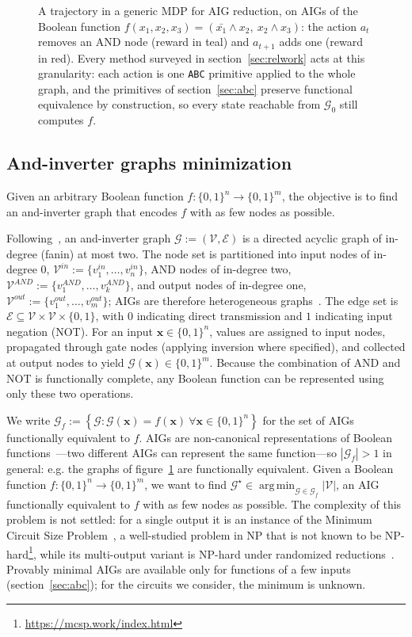 \documentclass{article}
\begin{document}
\begin{figure}[h]
  \caption{A trajectory in a generic MDP for AIG reduction, on AIGs of the Boolean function $f(x_1, x_2, x_3) = (\bar{x_1}\land x_2,\ x_2 \land x_3)$: the action $a_t$ removes an AND node (reward in teal) and $a_{t+1}$ adds one (reward in red). Every method surveyed in section~\ref{sec:relwork} acts at this granularity: each action is one \texttt{ABC} primitive applied to the whole graph, and the primitives of section~\ref{sec:abc} preserve functional equivalence by construction, so every state reachable from $\mathcal{G}_0$ still computes $f$.}
  \label{fig:mdp}
\end{figure}

\subsection{And-inverter graphs minimization}\label{sec:aig-min}
Given an arbitrary Boolean function $f:\{0, 1\}^n \rightarrow \{0, 1\}^m$, the objective is to find an and-inverter graph that encodes $f$ with as few nodes as possible.

Following~\citet{graphbench}, an and-inverter graph $\mathcal{G}:=(\mathcal{V}, \mathcal{E})$ is a directed acyclic graph of in-degree (fanin) at most two.
The node set is partitioned into input nodes of in-degree $0$, $\mathcal{V}^{in} := \{v^{in}_1,\dots,v^{in}_n\}$, AND nodes of in-degree two, $\mathcal{V}^{AND}:=\{v^{AND}_1,\dots,v^{AND}_k\}$, and output nodes of in-degree one, $\mathcal{V}^{out}:=\{v^{out}_1,\dots,v^{out}_m\}$; AIGs are therefore heterogeneous graphs~\cite{hetero}.
The edge set is $\mathcal{E}\subseteq \mathcal{V}\times \mathcal{V} \times \{0, 1\}$, with $0$ indicating direct transmission and $1$ indicating input negation (NOT).
For an input $\boldsymbol{x}\in \{0, 1\}^n$, values are assigned to input nodes, propagated through gate nodes (applying inversion where specified), and collected at output nodes to yield $\mathcal{G}(\boldsymbol{x})\in \{0, 1\}^m$.
Because the combination of AND and NOT is functionally complete, any Boolean function can be represented using only these two operations.

We write $\mathcal{G}_f:=\left\{\mathcal{G}: \mathcal{G} (\boldsymbol{x}) = f(\boldsymbol{x})\ \forall \boldsymbol{x}\in \{0, 1\}^n\right\}$ for the set of AIGs functionally equivalent to $f$.
AIGs are non-canonical representations of Boolean functions~\cite{fraig}---two different AIGs can represent the same function---so $|\mathcal{G}_f| > 1$ in general: e.g. the graphs of figure~\ref{fig:mdp} are functionally equivalent.
Given a Boolean function $f:\{0, 1\}^n \rightarrow \{0, 1\}^m$, we want to find $\mathcal{G}^\star \in \operatorname{arg\,min}_{\mathcal{G}\in \mathcal{G}_f} |\mathcal{V}|$, an AIG functionally equivalent to $f$ with as few nodes as possible.
The complexity of this problem is not settled: for a single output it is an instance of the Minimum Circuit Size Problem~\cite{nphard}, a well-studied problem in NP that is not known to be NP-hard\footnote{\url{https://mcsp.work/index.html}}, while its multi-output variant is NP-hard under randomized reductions~\cite{ilango2020}.
Provably minimal AIGs are available only for functions of a few inputs (section~\ref{sec:abc}); for the circuits we consider, the minimum is unknown.
\end{document}
